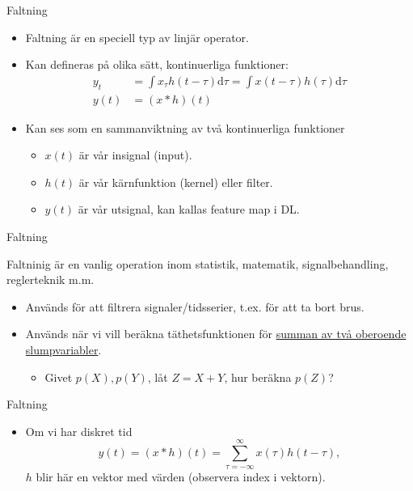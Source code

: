 \documentclass[10pt,english]{beamer}
\begin{document}
\begin{frame}{Faltning}

    \begin{itemize}
        \item Faltning är en speciell typ av linjär operator.
        \item Kan defineras på olika sätt, kontinuerliga funktioner:
        \begin{align*}
            y_t &= \int x_{\tau} h(t - \tau) \mathrm{d}\tau = \int x(t-\tau) h(\tau) \mathrm{d}\tau \\
            y(t) &= (x * h) (t)
        \end{align*}
        \item Kan ses som en sammanviktning av två kontinuerliga funktioner
        \begin{itemize}
            \item $x(t)$ är vår insignal (input).
            \item $h(t)$ är vår kärnfunktion (kernel) eller filter.
            \item $y(t)$ är vår utsignal, kan kallas feature map i DL.
        \end{itemize}
    \end{itemize}
    
\end{frame}

\begin{frame}{Faltning}

    Faltninig är en vanlig operation inom statistik, matematik, signalbehandling, reglerteknik m.m.
    \begin{itemize}
        \item Används för att filtrera signaler/tidsserier, t.ex. för att ta bort brus.
        \item Används när vi vill beräkna täthetsfunktionen för \href{https://en.wikipedia.org/wiki/Convolution_of_probability_distributions}{summan av två oberoende slumpvariabler}.
        \begin{itemize}
            \item Givet $p(X), p(Y)$, låt $Z = X + Y$, hur beräkna $p(Z)$?
        \end{itemize}
    \end{itemize}
    
\end{frame}

\begin{frame}{Faltning}

    \begin{itemize}
        \item Om vi har diskret tid
        \begin{equation*}
            y(t) = (x * h) (t) = \sum_{\tau = - \infty}^{\infty} x(\tau) h(t - \tau),
        \end{equation*}
        $h$ blir här en vektor med värden (observera index i vektorn).
    \end{itemize}
    
\end{frame}
\end{document}
